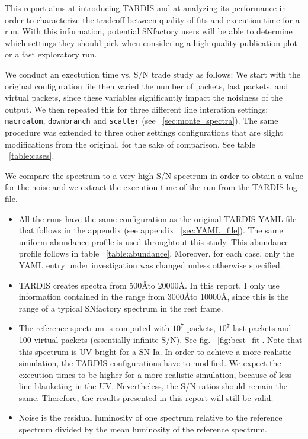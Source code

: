 \documentclass[letterpaper,12pt]{article}
\begin{document}
This report aims at introducing TARDIS and at analyzing its performance in order to characterize the tradeoff between quality of fits and execution time for a run. With this information, potential SNfactory users will be able to determine which settings they should pick when considering a high quality publication plot or a fast exploratory run.

We conduct an exectution time vs. S/N trade study as follows: We start with the original configuration file then varied the number of packets, last packets, and virtual packets, since these variables significantly impact the noisiness of the output. We then repeated this for three different line interation settings: \texttt{macroatom}, \texttt{downbranch} and \texttt{scatter} (see ~\ref{sec:monte_spectra}). The same procedure was extended to three other settings configurations that are slight modifications from the original, for the sake of comparison. See table ~\ref{table:cases}.

We compare the spectrum to a very high S/N spectrum in order to obtain a value for the noise and we extract the execution time of the run from the TARDIS log file.        

\begin{itemize}
\item All the runs have the same configuration as the original TARDIS YAML file that follows in the appendix (see appendix ~\ref{sec:YAML_file}). The same uniform abundance profile is used throughtout this study. This abundance profile follows in table ~\ref{table:abundance}. Moreover, for each case, only the YAML entry under investigation was changed unless otherwise specified. 

\item TARDIS creates spectra from 500\AA to 20000\AA. In this report, I only use information contained in the range from 3000\AA to 10000\AA, since this is the range of a typical SNfactory spectrum in the rest frame.

\item The reference spectrum is computed with  $10^7$ packets, $10^7$ last packets and 100 virtual packets (essentially infinite S/N). See fig. ~\ref{fig:best_fit}. Note that this spectrum is UV bright for a SN Ia. In order to achieve a more realistic simulation, the TARDIS configurations have to modified. We expect the execution times to be higher for a more realistic simulation, because of less line blanketing in the UV. Nevertheless, the S/N ratios should remain the same. Therefore, the results presented in this report will still be valid.

\item Noise is the residual luminosity of one spectrum relative to the reference spectrum divided by the mean luminosity of the reference spectrum. 
\end{itemize}
\end{document}
